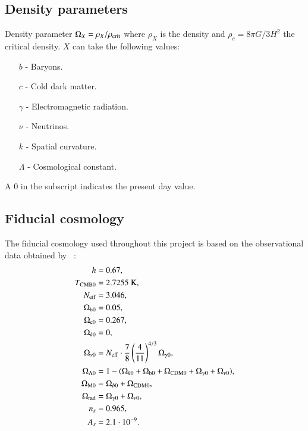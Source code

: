 \subsection*{Density parameters}
Density parameter $\Omega_X = \rho_X/\rho_\mathrm{crit}$ where $\rho_X$ is the density and $\rho_c=8\pi G/3H^2$ the critical density. $X$ can take the following values:
\begin{itemize}
    \item[$b$] - Baryons.
    \item[$c$] - Cold dark matter.
    \item[$\gamma$] - Electromagnetic radiation.
    \item[$\nu$] - Neutrinos.
    \item[$k$] - Spatial curvature.
    \item[$\Lambda$] - Cosmological constant.
\end{itemize}
A $0$ in the subscript indicates the present day value. 

\subsection*{Fiducial cosmology}
The fiducial cosmology used throughout this project is based on the observational data obtained by ~\cite{Planck2020}:
\begin{equation*}
        \begin{split}
                h &= 0.67, \\
                T_\mathrm{CMB0} &= 2.7255\text{ {K}}, \\
                N_\mathrm{eff} &= 3.046, \\
                \Omega_\mathrm{b0} &= 0.05, \\
                \Omega_\mathrm{c0} &= 0.267, \\
                \Omega_{k0} &= 0, \\
                \Omega_{\nu0} &= N_\mathrm{eff} \cdot \frac{7}{8}\left(\frac{4}{11}\right)^{4/3}\Omega_{\gamma0}, \\
                \Omega_{\Lambda0} &= 1- (\Omega_{k0} + \Omega_\mathrm{b0} + \Omega_\mathrm{CDM0} + \Omega_{\gamma0} + \Omega_{\nu0}),\\
                \Omega_\mathrm{M0} &= \Omega_{b0} + \Omega_\mathrm{CDM0}, \\
                \Omega_\mathrm{rad} &= \Omega_{\gamma0} + \Omega_{\nu0},\\
                n_s &= 0.965, \\
                A_s &= 2.1\cdot10^{-9}.
        \end{split}
\end{equation*}